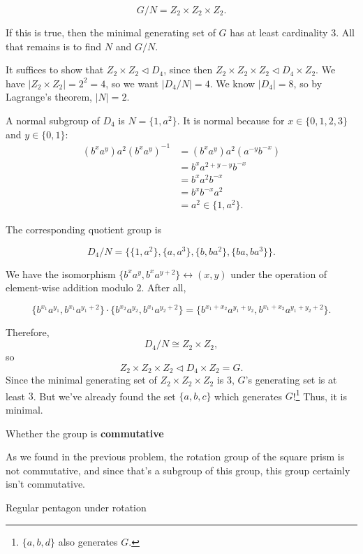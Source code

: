 \documentclass[../gatm_answers.tex]{subfiles}
\begin{document}
$$G/N = Z_2\times Z_2\times Z_2.$$

If this is true, then the minimal generating set of $G$ has at least cardinality $3$. All that remains is to find $N$ and $G/N$.

It suffices to show that $Z_2\times Z_2\triangleleft D_4$, since then $Z_2\times Z_2\times Z_2\triangleleft D_4\times Z_2.$ We have $|Z_2\times Z_2| = 2^2 = 4$, so we want $|D_4/N|=4$. We know $|D_4|=8$, so by Lagrange's theorem, $|N|=2$.

A normal subgroup of $D_4$ is $N=\{1,a^2\}$. It is normal because for $x\in\{0,1,2,3\}$ and $y\in\{0,1\}$:
\begin{align*}
(b^xa^y)a^2(b^xa^y)^{-1} &= (b^xa^y)a^2(a^{-y}b^{-x}) \\
&= b^xa^{2+y-y}b^{-x} \\
&= b^xa^2b^{-x} \\
&= b^xb^{-x}a^2 \\
&= a^2 \in \{1,a^2\}.
\end{align*}

The corresponding quotient group is

$$D_4/N = \{\{1,a^2\}, \{a,a^3\}, \{b,ba^2\}, \{ba, ba^3\}\}.$$

We have the isomorphism $\{b^xa^{y},b^xa^{y+2}\}\leftrightarrow (x,y)$ under the operation of element-wise addition modulo $2$. After all,

$$\{b^{x_1}a^{y_1},b^{x_1}a^{y_1+2}\}\cdot \{b^{x_2}a^{y_2},b^{x_1}a^{y_2+2}\} = \{b^{x_1+x_2}a^{y_1+y_2},b^{x_1+x_2}a^{y_1+y_2+2}\}.$$

Therefore, $$D_4/N \cong Z_2 \times Z_2,$$ so $$Z_2 \times Z_2 \times Z_2 \triangleleft D_4\times Z_2=G.$$ Since the minimal generating set of $Z_2\times Z_2\times Z_2$ is $3$, $G$'s generating set is at least $3$. But we've already found the set $\{a,b,c\}$ which generates $G$!\footnote{$\{a,b,d\}$ also generates $G$.} Thus, it is minimal.

\begin{inner_problem}
\item Whether the group is \textbf{commutative}
\end{inner_problem}

As we found in the previous problem, the rotation group of the square prism is not commutative, and since that's a subgroup of this group, this group certainly isn't commutative.

\begin{outer_problem}
\item Regular pentagon under rotation
\end{outer_problem}
\end{document}
